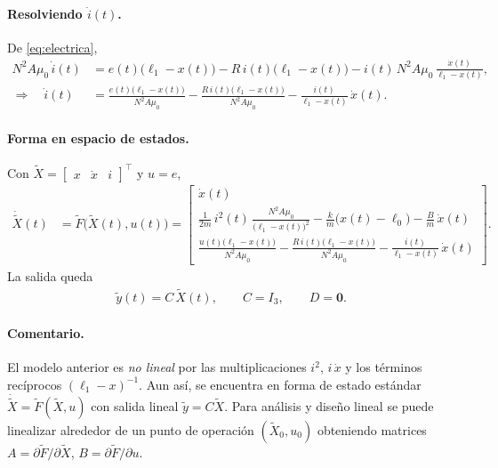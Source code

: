 \documentclass[
  11pt,
  letterpaper,
   addpoints,
   answers
  ]{exam}
\begin{document}
\begin{solution}
\paragraph{Resolviendo \(\dot i(t)\).}
De \eqref{eq:electrica},
\begin{align}
N^{2}A\mu_{0}\,\dot i(t)
&= e(t)\big(\ell_{1}-x(t)\big)
   - R\,i(t)\big(\ell_{1}-x(t)\big)
   - i(t)\,N^{2}A\mu_{0}\,\frac{\dot x(t)}{\ell_{1}-x(t)},
\\[4pt]
\Rightarrow\quad
\dot i(t)
&= \frac{e(t)\big(\ell_{1}-x(t)\big)}{N^{2}A\mu_{0}}
   - \frac{R\,i(t)\big(\ell_{1}-x(t)\big)}{N^{2}A\mu_{0}}
   - \frac{i(t)}{\ell_{1}-x(t)}\,\dot x(t).
\tag{3}\label{eq:idi}
\end{align}

\paragraph{Forma en espacio de estados.}
Con \(\tilde{X}=\begin{bmatrix}x & \dot x & i\end{bmatrix}^{\!\top}\) y \(u=e\),
\begin{align}
\dot{\tilde{X}}(t)
&=
\tilde{F}\big(\tilde{X}(t),u(t)\big)
=
\begin{bmatrix}
\dot x(t)\\[2pt]
\displaystyle
\frac{1}{2m}\,i^{2}(t)\,\frac{N^{2}A\mu_{0}}{\big(\ell_{1}-x(t)\big)^{2}}
- \frac{k}{m}\big(x(t)-\ell_{0}\big)
- \frac{B}{m}\,\dot x(t)
\\[10pt]
\displaystyle
\frac{u(t)\big(\ell_{1}-x(t)\big)}{N^{2}A\mu_{0}}
- \frac{R\,i(t)\big(\ell_{1}-x(t)\big)}{N^{2}A\mu_{0}}
- \frac{i(t)}{\ell_{1}-x(t)}\,\dot x(t)
\end{bmatrix}.
\tag{4}
\end{align}
La salida queda
\begin{align}
\tilde{y}(t) = C\,\tilde{X}(t),
\qquad C=I_{3},\qquad D=\mathbf{0}.
\tag{5}
\end{align}

\paragraph{Comentario.}
El modelo anterior es \emph{no lineal} por las multiplicaciones \(i^2\), \(i\,\dot x\) y los términos recíprocos \((\ell_{1}-x)^{-1}\). Aun así, se encuentra en forma de estado estándar \(\dot{\tilde{X}}=\tilde{F}(\tilde{X},u)\) con salida lineal \(\tilde{y}=C\tilde{X}\). Para análisis y diseño lineal se puede linealizar alrededor de un punto de operación \((\tilde{X}_0,u_0)\) obteniendo matrices \(A=\partial \tilde{F}/\partial \tilde{X}\), \(B=\partial \tilde{F}/\partial u\).
\end{solution}
\end{document}
